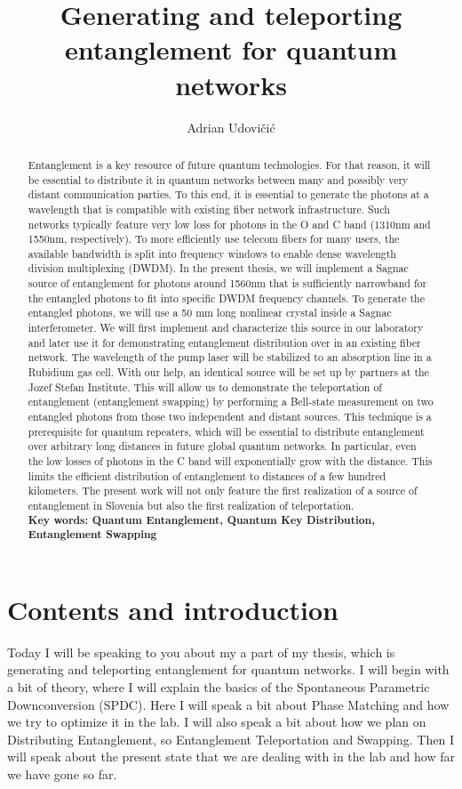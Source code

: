 \documentclass{article}
\title{Generating and teleporting entanglement for quantum networks}
\author{Adrian Udovičić}
\date{}
\begin{document}
\maketitle

\begin{abstract}
Entanglement is a key resource of future quantum technologies. For that reason, it will be essential to distribute 
it in quantum networks between many and possibly very distant communication parties. To this end, it is essential 
to generate the photons at a wavelength that is compatible with existing fiber network infrastructure. Such networks typically feature 
very low loss for photons in the O and C band (1310nm and 1550nm, respectively). To more 
efficiently use telecom fibers for many users, the available bandwidth is split into frequency windows to enable dense wavelength 
division multiplexing (DWDM). In the present thesis, we will implement a Sagnac source of entanglement for photons around 1560nm 
that is sufficiently narrowband for the entangled photons to fit into specific DWDM frequency channels. To generate the 
entangled photons, we will use a 50 mm long nonlinear crystal inside a Sagnac interferometer. We will first 
implement and characterize this source in our laboratory and later use it for demonstrating entanglement distribution over in an existing 
fiber network. The wavelength of the pump laser will be stabilized to an absorption line in a Rubidium gas cell. 
With our help, an identical source will be set up by partners at the Jozef Stefan Institute. This will allow us to demonstrate the teleportation of entanglement 
(entanglement swapping) by performing a Bell-state measurement on two entangled photons from those two independent and distant sources. This technique is a prerequisite for quantum 
repeaters, which will be essential to distribute entanglement over arbitrary long distances in future global quantum networks. In particular, even the low losses of photons in 
the C band will exponentially grow with the distance. This limits the efficient distribution of entanglement to distances of a few hundred kilometers.
The present work will not only feature the first realization of a source of entanglement in Slovenia but also the first realization of teleportation.\\
\textbf{Key words: Quantum Entanglement, Quantum Key Distribution, Entanglement Swapping}
\end{abstract}

\section{Contents and introduction}
Today I will be speaking to you about my a part of my thesis, which is generating and teleporting entanglement for quantum networks. I will begin with a bit of theory,
where I will explain the basics of the Spontaneous Parametric Downconversion (SPDC). Here I will speak a bit about Phase Matching and how we try to optimize it in the lab. I will also
speak a bit about how we plan on Distributing Entanglement, so Entanglement Teleportation and Swapping.
Then I will speak about the present state that we are dealing with in the lab and how far we have gone so far.
\end{document}
